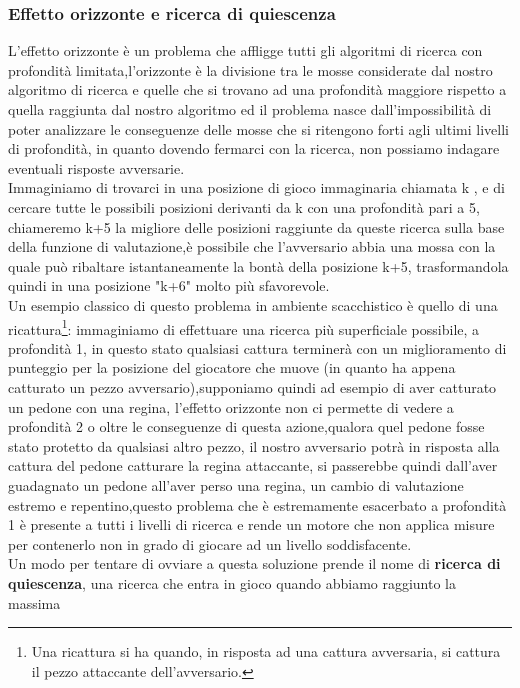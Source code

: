 \subsubsection{Effetto orizzonte e ricerca di quiescenza}
L'effetto orizzonte è un problema che affligge tutti gli algoritmi di ricerca con profondità limitata,l'orizzonte è la divisione 
tra le mosse considerate dal nostro algoritmo di ricerca e quelle  che si trovano ad una profondità maggiore rispetto a quella raggiunta dal nostro algoritmo 
ed il problema nasce dall'impossibilità di poter analizzare le conseguenze delle mosse che si ritengono forti agli ultimi livelli di profondità, in quanto dovendo fermarci con la ricerca,
non possiamo indagare eventuali risposte avversarie.\\
Immaginiamo di trovarci in una posizione di gioco immaginaria chiamata k , e di cercare tutte le possibili posizioni derivanti da k con una profondità pari a 5,
chiameremo k+5 la migliore delle posizioni raggiunte da queste ricerca sulla base della funzione di valutazione,è possibile che
l'avversario abbia una mossa con la quale può ribaltare istantaneamente la bontà della posizione k+5, trasformandola quindi in una posizione
"k+6" molto più sfavorevole.\\
Un esempio classico di questo problema in ambiente scacchistico è quello di una ricattura\footnote{Una ricattura si ha quando, in risposta ad una cattura avversaria, si cattura il pezzo attaccante dell'avversario.}: immaginiamo 
di effettuare una ricerca più superficiale possibile, a profondità 1, in questo stato qualsiasi cattura terminerà con un miglioramento di punteggio 
per la posizione del giocatore che muove (in quanto ha appena catturato un pezzo avversario),supponiamo quindi ad esempio di aver catturato un pedone con una regina,
l'effetto orizzonte non ci permette di vedere a profondità 2 o oltre le conseguenze di questa azione,qualora quel pedone fosse stato 
protetto da qualsiasi altro pezzo, il nostro avversario potrà in risposta alla cattura del pedone catturare la regina attaccante,
si passerebbe quindi dall'aver guadagnato un pedone all'aver perso una regina, un cambio di valutazione estremo e repentino,questo problema che è estremamente esacerbato a profondità 1 è presente a tutti i livelli di ricerca e rende un motore che non applica misure per contenerlo 
non in grado di giocare ad un livello soddisfacente. 
\\Un modo per tentare di ovviare a questa soluzione prende il nome di \textbf{ricerca di quiescenza}, una ricerca che entra in gioco quando abbiamo raggiunto la massima 
